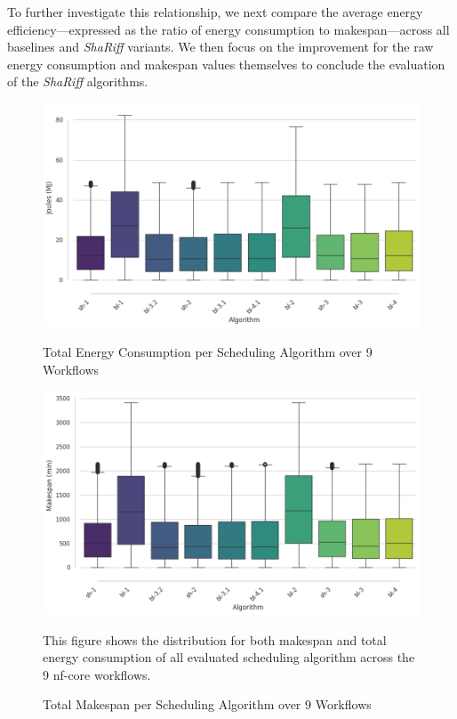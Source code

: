 To further investigate this relationship, we next compare the average energy efficiency—expressed as the ratio of energy consumption to makespan—across all baselines and \textit{ShaRiff} variants. We then focus on the improvement for the raw energy consumption and makespan values themselves to conclude the evaluation of the \textit{ShaRiff} algorithms.
\begin{figure}[H]
    \centering
    \includegraphics[scale=0.5]{fig/06/06-boxplot-energy.png}
    \small \caption{Total Energy Consumption per Scheduling Algorithm over 9 Workflows}
    \tiny
    \includegraphics[scale=0.5]{fig/06/06-boxplot-runtime.png}
    \small \caption{Total Makespan per Scheduling Algorithm over 9 Workflows}
    \label{fig:boxplot_runtime}
    \tiny
    This figure shows the distribution for both makespan and total energy consumption of all evaluated scheduling algorithm across the 9 nf-core workflows.
\end{figure}

